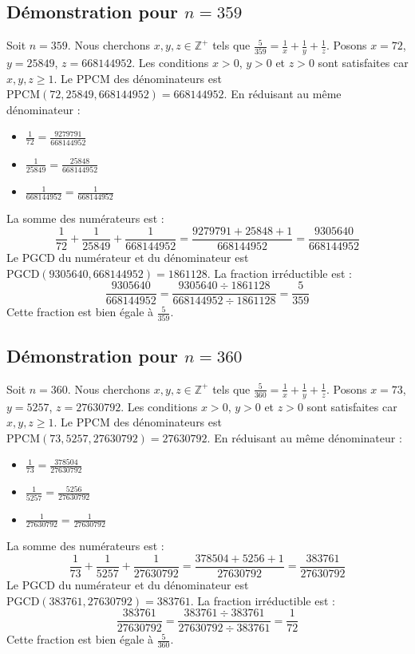 \documentclass[11pt,a4paper]{article}
\begin{document}
\subsection{Démonstration pour $n = 359$}
Soit $n = 359$. Nous cherchons $x, y, z \in \mathbb{Z}^{+}$ tels que $\frac{5}{359} = \frac{1}{x} + \frac{1}{y} + \frac{1}{z}$.
Posons $x = 72$, $y = 25849$, $z = 668144952$.
Les conditions $x > 0$, $y > 0$ et $z > 0$ sont satisfaites car $x, y, z \geq 1$.
Le PPCM des dénominateurs est $\text{PPCM}(72, 25849, 668144952) = 668144952$.
En réduisant au même dénominateur :
\begin{itemize}
    \item $\frac{1}{72} = \frac{9279791}{668144952}$
    \item $\frac{1}{25849} = \frac{25848}{668144952}$
    \item $\frac{1}{668144952} = \frac{1}{668144952}$
\end{itemize}
La somme des numérateurs est :
$$ \frac{1}{72} + \frac{1}{25849} + \frac{1}{668144952} = \frac{9279791 + 25848 + 1}{668144952} = \frac{9305640}{668144952} $$
Le PGCD du numérateur et du dénominateur est $\text{PGCD}(9305640, 668144952) = 1861128$.
La fraction irréductible est :
$$ \frac{9305640}{668144952} = \frac{9305640 \div 1861128}{668144952 \div 1861128} = \frac{5}{359} $$
Cette fraction est bien égale à $\frac{5}{359}$.

\subsection{Démonstration pour $n = 360$}
Soit $n = 360$. Nous cherchons $x, y, z \in \mathbb{Z}^{+}$ tels que $\frac{5}{360} = \frac{1}{x} + \frac{1}{y} + \frac{1}{z}$.
Posons $x = 73$, $y = 5257$, $z = 27630792$.
Les conditions $x > 0$, $y > 0$ et $z > 0$ sont satisfaites car $x, y, z \geq 1$.
Le PPCM des dénominateurs est $\text{PPCM}(73, 5257, 27630792) = 27630792$.
En réduisant au même dénominateur :
\begin{itemize}
    \item $\frac{1}{73} = \frac{378504}{27630792}$
    \item $\frac{1}{5257} = \frac{5256}{27630792}$
    \item $\frac{1}{27630792} = \frac{1}{27630792}$
\end{itemize}
La somme des numérateurs est :
$$ \frac{1}{73} + \frac{1}{5257} + \frac{1}{27630792} = \frac{378504 + 5256 + 1}{27630792} = \frac{383761}{27630792} $$
Le PGCD du numérateur et du dénominateur est $\text{PGCD}(383761, 27630792) = 383761$.
La fraction irréductible est :
$$ \frac{383761}{27630792} = \frac{383761 \div 383761}{27630792 \div 383761} = \frac{1}{72} $$
Cette fraction est bien égale à $\frac{5}{360}$.
\end{document}
